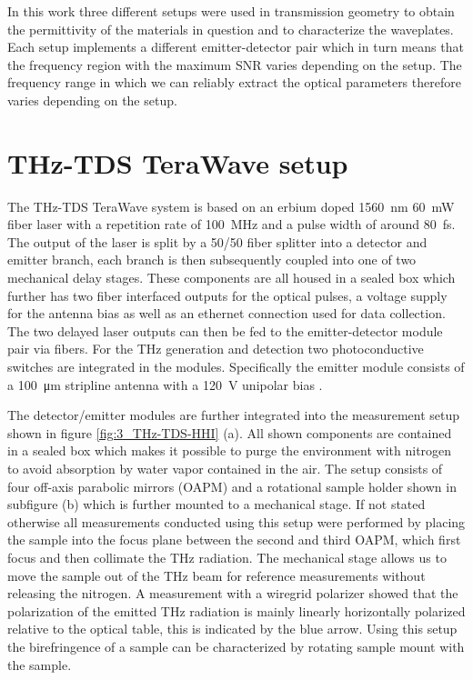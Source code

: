 \label{ch:setups}
In this work three different setups were used in transmission geometry to obtain the permittivity of the materials in question and to characterize the waveplates. Each setup implements a different emitter-detector pair which in turn means that the frequency region with the maximum SNR varies depending on the setup. The frequency range in which we can reliably extract the optical parameters therefore varies depending on the setup. 

\section{THz-TDS TeraWave setup}
The THz-TDS TeraWave system is based on an erbium doped \SI{1560}{\nano \meter} \SI{60}{\milli \watt} fiber laser with a repetition rate of \SI{100}{\mega \hertz} and a pulse width of around \SI{80}{\femto \second}. The output of the laser is split by a 50/50 fiber splitter into a detector and emitter branch, each branch is then subsequently coupled into one of two mechanical delay stages. These components are all housed in a sealed box which further has two fiber interfaced outputs for the optical pulses, a voltage supply for the antenna bias as well as an ethernet connection used for data collection. The two delayed laser outputs can then be fed to the emitter-detector module pair via fibers. For the THz generation and detection two photoconductive  switches are integrated in the modules. Specifically the emitter module consists of a \SI{100}{\micro \meter} stripline antenna with a \SI{120}{\volt} unipolar bias \cite{Vieweg2014}. %

The detector/emitter modules are further integrated into the measurement setup shown in figure \ref{fig:3_THz-TDS-HHI} (a). All shown components are contained in a sealed box which makes it possible to purge the environment with nitrogen to avoid absorption by water vapor contained in the air. The setup consists of four off-axis parabolic mirrors (OAPM) and a rotational sample holder shown in subfigure (b) which is further mounted to a mechanical stage. If not stated otherwise all measurements conducted using this setup were performed by placing the sample into the focus plane between the second and third OAPM, which first focus and then collimate the THz radiation. The mechanical stage allows us to move the sample out of the THz beam for reference measurements without releasing the nitrogen. A measurement with a wiregrid polarizer showed that the polarization of the emitted THz radiation is mainly linearly horizontally polarized relative to the optical table, this is indicated by the blue arrow. Using this setup the birefringence of a sample can be characterized by rotating sample mount with the sample.


